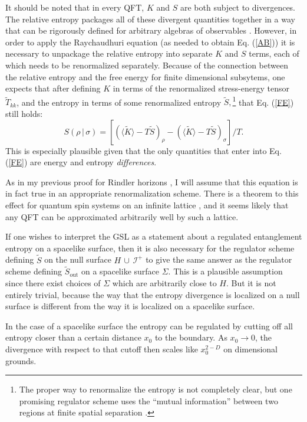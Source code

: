 \documentclass{article}
\begin{document}
It should be noted that in every QFT, $K$ and $S$ are both subject to divergences.  The relative entropy packages all of these divergent quantities together in a way that can be rigorously defined for arbitrary algebras of observables \cite{araki75}.  However, in order to apply the Raychaudhuri equation (as needed to obtain Eq. (\ref{AB})) it is necessary to unpackage the relative entropy into separate $K$ and $S$ terms, each of which needs to be renormalized separately.  Because of the connection between the relative entropy and the free energy for finite dimensional subsytems, one expects that after defining $K$ in terms of the renormalized stress-energy tensor $\tilde{T}_{kk}$, and the entropy in terms of some renormalized entropy $\tilde{S},$\footnote{The proper way to renormalize the entropy is not completely clear, but one promising regulator scheme uses the ``mutual information'' between two regions at finite spatial separation \cite{casini06}.} that Eq. (\ref{FE}) still holds:
\begin{equation}
S(\rho\,|\,\sigma) = [(\langle \tilde{K} \rangle - T\tilde{S})_\rho -
(\langle \tilde{K} \rangle - T \tilde{S})_\sigma]/T.
\end{equation}
This is especially plausible given that the only quantities that enter into Eq. (\ref{FE}) are energy and entropy \emph{differences}.

As in my previous proof for Rindler horizons \cite{rindler}, I will assume that this equation is in fact true in an appropriate renormalization scheme.  There is a theorem to this effect for quantum spin systems on an infinite lattice \cite{AS77}, and it seems likely that any QFT can be approximated arbitrarily well by such a lattice.

If one wishes to interpret the GSL as a statement about a regulated entanglement entropy on a spacelike surface, then it is also necessary for the regulator scheme defining $\tilde{S}$ on the null surface $H\,\cup\,\mathcal{I}^+$ to give the same answer as the regulator scheme defining $\tilde{S}_\mathrm{out}$ on a spacelike surface $\Sigma$.  This is a plausible assumption since there exist choices of $\Sigma$ which are arbitrarily close to $H$.  But it is not entirely trivial, because the way that the entropy divergence is localized on a null surface is different from the way it is localized on a spacelike surface.

In the case of a spacelike surface the entropy can be regulated by cutting off all entropy closer than a certain distance $x_0$ to the boundary.  As $x_0 \to 0$, the divergence with respect to that cutoff then scales like $x_0^{2-D}$ on dimensional grounds.
\end{document}
